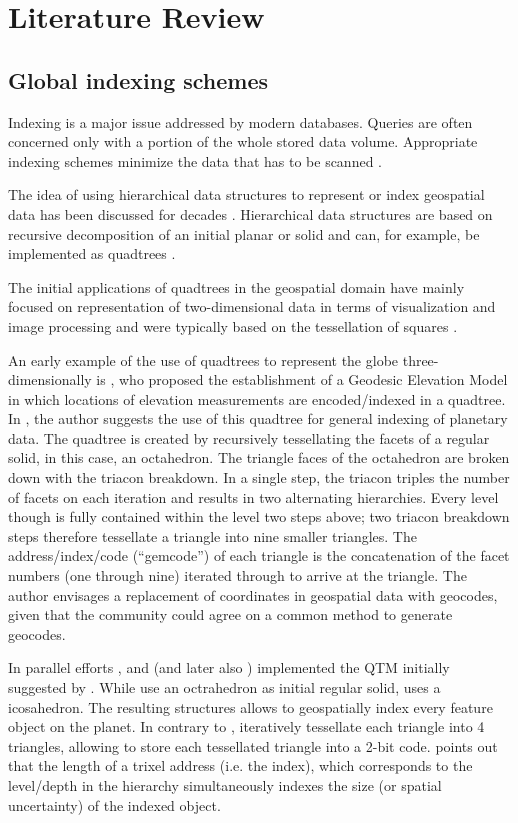 \documentclass[a4paper,10pt]{article}
\begin{document}
\newpage
\section{Literature Review}
\subsection{Global indexing schemes}
\label{lit_index}
Indexing is a major issue addressed by modern databases. 
Queries are often concerned only with a portion of the whole stored data volume.
Appropriate indexing schemes minimize the data that has to be scanned \citep{Kunszt2000}.

The idea of using hierarchical data structures to represent or index geospatial data has been discussed for decades \citep{Dutton1996, Samet1988}.
Hierarchical data structures are based on recursive decomposition of an initial planar or solid and can, for example, be implemented as quadtrees \citep{Samet1988}.

The initial applications of quadtrees in the geospatial domain have mainly focused on representation of two-dimensional data in terms of visualization and image processing and were typically based on the tessellation of squares \citep{Lugo1995}.

An early example of the use of quadtrees to represent the globe three-dimensionally is \citep{Dutton1984}, who proposed the establishment of a Geodesic Elevation Model in which locations of elevation measurements are encoded/indexed in a quadtree. 
In \citep{Dutton1989}, the author suggests the use of this quadtree for general indexing of planetary data.
The quadtree is created by recursively tessellating the facets of a regular solid, in this case, an octahedron.
The triangle faces of the octahedron are broken down with the triacon breakdown. In a single step, the triacon triples the number of facets on each iteration and results in two alternating hierarchies. Every level though is fully contained within the level two steps above; two triacon breakdown steps therefore tessellate a triangle into nine smaller triangles. The address/index/code (``gemcode'') of each triangle is the concatenation of the facet numbers (one through nine) iterated through to arrive at the triangle. The author envisages a replacement of coordinates in geospatial data with geocodes, given that the community could agree on a common method to generate geocodes.

In parallel efforts \citep{Fekete1990, Fekete1990a}, and \citep{Goodchild1992a} (and later also \cite{Lugo1995}) implemented the \gls{QTM} initially suggested by \citep{Dutton1984}. While \citep{Goodchild1992a} use an octrahedron as initial regular solid, \citep{Fekete1990, Fekete1990a} uses a icosahedron.
The resulting structures allows to geospatially index every feature object on the planet. 
In contrary to \citep{Dutton1984}, \citep{Fekete1990, Fekete1990a, Goodchild1992a, Lugo1995} iteratively tessellate each triangle into 4 triangles, allowing to store each tessellated triangle into a 2-bit code.
\citep{Goodchild1992a} points out that the length of a trixel address (i.e. the index), which corresponds to the level/depth in the hierarchy simultaneously indexes the size (or spatial uncertainty) of the indexed object.
\end{document}
